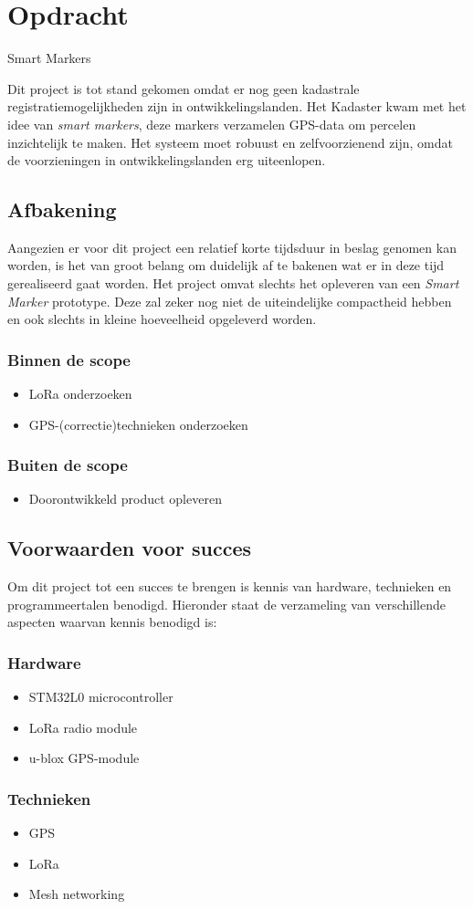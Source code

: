 \section{Opdracht}
\label{sec:opdracht}
Smart Markers

Dit project is tot stand gekomen omdat er nog geen kadastrale registratiemogelijkheden 
zijn in ontwikkelingslanden. Het Kadaster kwam met het idee van \textit{smart markers}, 
deze markers verzamelen GPS-data om percelen inzichtelijk te maken. Het systeem moet 
robuust en zelfvoorzienend zijn, omdat de voorzieningen in ontwikkelingslanden erg 
uiteenlopen.

\subsection{Afbakening}
Aangezien er voor dit project een relatief korte tijdsduur in beslag genomen
kan worden, is het van groot belang om duidelijk af te bakenen wat er in deze
tijd gerealiseerd gaat worden.
Het project omvat slechts het opleveren van een \textit{Smart Marker} prototype. 
Deze zal zeker nog niet de uiteindelijke compactheid hebben en ook slechts in 
kleine hoeveelheid opgeleverd worden.

\subsubsection{Binnen de scope}
\begin{itemize}
    \item LoRa onderzoeken
    \item GPS-(correctie)technieken onderzoeken
\end{itemize}

\subsubsection{Buiten de scope}
\begin{itemize}
    \item Doorontwikkeld product opleveren
\end{itemize}

\subsection{Voorwaarden voor succes}
Om dit project tot een succes te brengen is kennis van hardware, technieken
en programmeertalen benodigd. Hieronder staat de verzameling van verschillende
aspecten waarvan kennis benodigd is:
\subsubsection{Hardware}
\begin{itemize}
    \item STM32L0 microcontroller
    \item LoRa radio module
    \item u-blox GPS-module
\end{itemize}
\subsubsection{Technieken}
\begin{itemize}
    \item GPS
    \item LoRa
    \item Mesh networking
\end{itemize}
